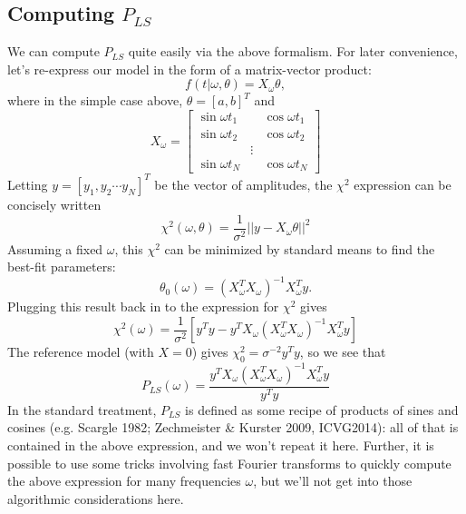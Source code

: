 \documentclass[12pt,pdftex]{article}
\begin{document}
\subsection{Computing $P_{LS}$}
We can compute $P_{LS}$ quite easily via the above formalism.
For later convenience, let's re-express our model in the form of a matrix-vector product:
\begin{equation}
  f(t|\omega, \theta) = X_\omega \theta,
\end{equation}
where in the simple case above, $\theta = [a, b]^T$ and
\begin{equation}
  X_\omega = \left[\begin{array}{lll}
    \sin\omega t_1 && \cos\omega t_1\\
    \sin\omega t_2 && \cos\omega t_2\\
     & \vdots &\\
    \sin\omega t_N && \cos\omega t_N
  \end{array}\right]
\end{equation}
Letting $y = [y_1, y_2\cdots y_N]^T$ be the vector of amplitudes, the $\chi^2$ expression can be concisely written
\begin{equation}
\chi^2(\omega, \theta) = \frac{1}{\sigma^2}||y - X_\omega \theta||^2
\end{equation}
Assuming a fixed $\omega$, this $\chi^2$ can be minimized by standard means to find the best-fit parameters:
\begin{equation}
\label{eq:thetaML}
  \theta_0(\omega) = (X_\omega^TX_\omega)^{-1}X_\omega^Ty.
\end{equation}
Plugging this result back in to the expression for $\chi^2$ gives
\begin{equation}
\label{eq:chi2}
  \chi^2(\omega) = \frac{1}{\sigma^2}\left[
    y^Ty - y^TX_\omega(X_\omega^TX_\omega)^{-1}X_\omega^Ty
    \right]
\end{equation}
The reference model (with $X=0$) gives $\chi_0^2 = \sigma^{-2}y^Ty$, so we see that
\begin{equation}
  P_{LS}(\omega) = \frac{y^TX_\omega(X_\omega^TX_\omega)^{-1}X_\omega^Ty}{y^Ty}
\end{equation}
In the standard treatment, $P_{LS}$ is defined as some recipe of products of sines and cosines (e.g. Scargle 1982; Zechmeister \& Kurster 2009, ICVG2014): all of that is contained in the above expression, and we won't repeat it here. Further, it is possible to use some tricks involving fast Fourier transforms to quickly compute the above expression for many frequencies $\omega$, but we'll not get into those algorithmic considerations here.
\end{document}
